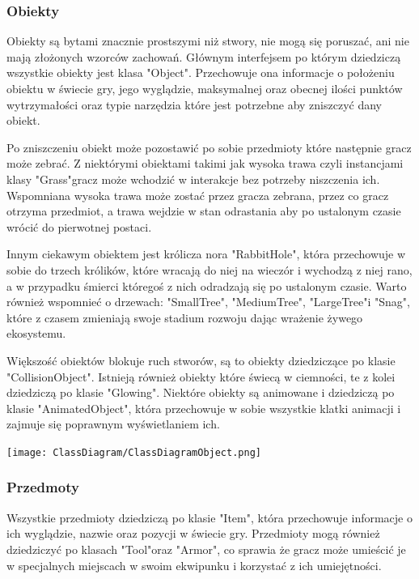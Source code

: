 \documentclass{article}
\begin{document}
%      

\subsubsection{Obiekty}
Obiekty są bytami znacznie prostszymi niż stwory, nie mogą się poruszać, ani nie mają złożonych wzorców zachowań. Głównym interfejsem po którym dziedziczą wszystkie obiekty jest klasa "Object". Przechowuje ona informacje o położeniu obiektu w świecie gry, jego wyglądzie, maksymalnej oraz obecnej ilości punktów wytrzymałości oraz typie narzędzia które jest potrzebne aby zniszczyć dany obiekt.

Po zniszczeniu obiekt może pozostawić po sobie przedmioty które następnie gracz może zebrać. Z niektórymi obiektami takimi jak wysoka trawa czyli instancjami klasy "Grass"\space gracz może wchodzić w interakcje bez potrzeby niszczenia ich. Wspomniana wysoka trawa może zostać przez gracza zebrana, przez co gracz otrzyma przedmiot, a trawa wejdzie w stan odrastania aby po ustalonym czasie wrócić do pierwotnej postaci.

Innym ciekawym obiektem jest królicza nora "RabbitHole", która przechowuje w sobie do trzech królików, które wracają do niej na wieczór i wychodzą z niej rano, a w przypadku śmierci któregoś z nich odradzają się po ustalonym czasie. Warto również wspomnieć o drzewach: "SmallTree", "MediumTree", "LargeTree"\space i "Snag", które z czasem zmieniają swoje stadium rozwoju dając wrażenie żywego ekosystemu.

Większość obiektów blokuje ruch stworów, są to obiekty dziedziczące po klasie "CollisionObject". Istnieją również obiekty które świecą w ciemności, te z kolei dziedziczą po klasie "Glowing". Niektóre obiekty są animowane i dziedziczą po klasie "AnimatedObject", która przechowuje w sobie wszystkie klatki animacji i zajmuje się poprawnym wyświetlaniem ich.

\begin{center}
     \texttt{[image: ClassDiagram/ClassDiagramObject.png]}
\end{center}

\subsubsection{Przedmoty}
Wszystkie przedmioty dziedziczą po klasie "Item", która przechowuje informacje o ich wyglądzie, nazwie oraz pozycji w świecie gry. Przedmioty mogą również dziedziczyć po klasach "Tool"\space oraz "Armor", co sprawia że gracz może umieścić je w specjalnych miejscach w swoim ekwipunku i korzystać z ich umiejętności.
\end{document}
